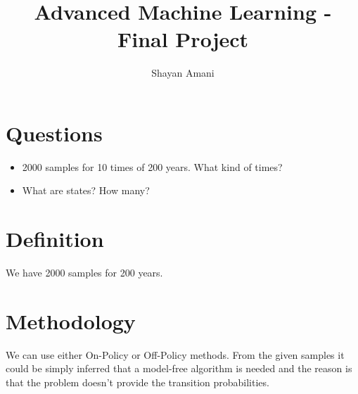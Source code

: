 \documentclass[a4paper,12pt]{article}
\title{Advanced Machine Learning - Final Project}
\author{Shayan Amani}
\begin{document}
\maketitle

\section{Questions}
\begin{itemize}
    \item 2000 samples for 10 times of 200 years. What kind of times?
    \item What are states? How many?
\end{itemize}

\section{Definition}
We have 2000 samples for 200 years.

\section{Methodology}
We can use either On-Policy or Off-Policy methods. From the given samples it could be simply inferred that a model-free algorithm is needed and the reason is that the problem doesn't provide the transition probabilities.
\end{document}
